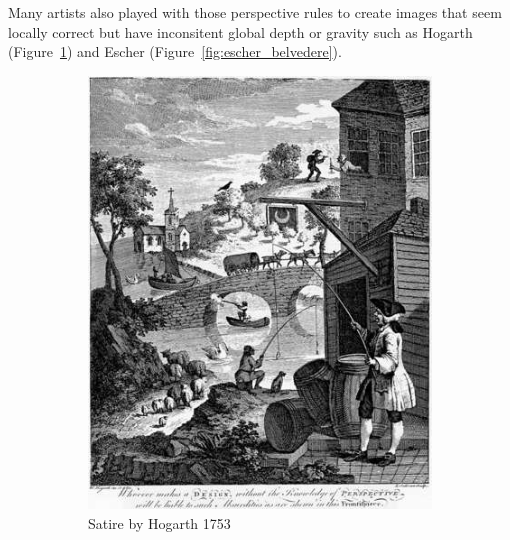 Many artists also played with those perspective rules to create images
that seem locally correct but have inconsitent global depth or gravity
such as Hogarth (Figure~\ref{fig:hogarth_satire})
and Escher (Figure~\ref{fig:escher_belvedere}).

\begin{figure}[h]
\centering
\begin{subfigure}[b]{0.52\textwidth}
	\includegraphics[width=\textwidth]{assets/img/hogarth_satire.jpg}
	\caption{Satire by Hogarth 1753}%
	\label{fig:hogarth_satire}
\end{subfigure}
\hfill
\begin{subfigure}[b]{0.42\textwidth}

\end{subfigure}
\end{figure}
